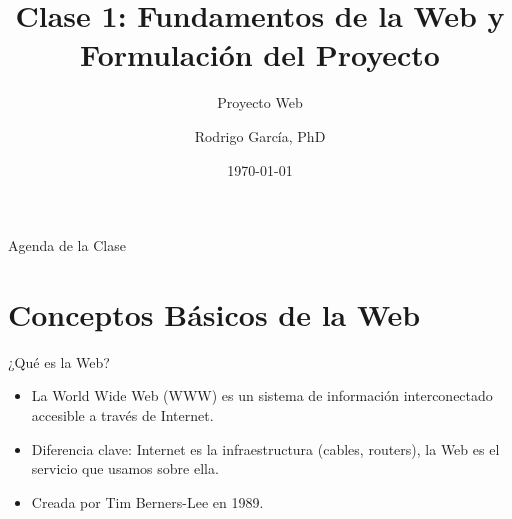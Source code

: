 \documentclass{beamer}
\title[Clase 1: Fundamentos y Formulación]{Clase 1: Fundamentos de la Web y Formulación del Proyecto}
\subtitle{Proyecto Web}
\author{Rodrigo García, PhD}
\date{\today}
\begin{document}
\begin{frame}
    \titlepage
\end{frame}

\begin{frame}{Agenda de la Clase}
    \tableofcontents
\end{frame}

\section{Conceptos Básicos de la Web}

\begin{frame}{¿Qué es la Web?}
    \begin{itemize}
        \item La World Wide Web (WWW) es un sistema de información interconectado accesible a través de Internet.
        \item Diferencia clave: Internet es la infraestructura (cables, routers), la Web es el servicio que usamos sobre ella.
        \item Creada por Tim Berners-Lee en 1989.
    \end{itemize}
\end{frame}
\end{document}
